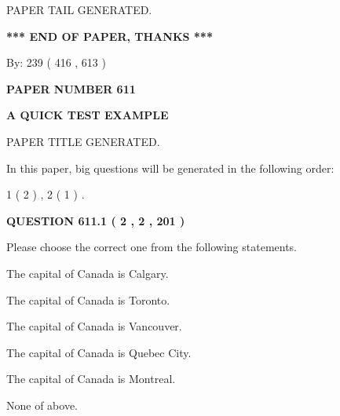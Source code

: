 \documentclass[12pt]{article}
\begin{document}
   
   
\vspace{2.0in} PAPER TAIL GENERATED.
   
   
   
   
\vspace{1.0in} 
{\textbf{\large{ *** END OF PAPER, THANKS *** }}} 
   
   
\hspace{1.0in} By: 
 239 ( 416 ,  613 )
   
   
   
   
\newpage 
\setcounter{page}{ 
   611001 } 
   
   
   
   
 {\textbf{ \Large{ PAPER NUMBER  611  }}}
   
   
\vspace{0.2in}
   
   
   
   
   
   
   
   
 \vspace{0.2in}
{\LARGE {\textbf{ A QUICK TEST EXAMPLE}}}
   
   
 PAPER TITLE GENERATED.
   
   
   
\vspace{0.2in}
   
In this paper, big questions will be generated in the following order: 
   
   
   1 ( 2 )
 ,
   2 ( 1 )
 .
  
\vspace{0.2in}
  
{\textbf{\Large{QUESTION
611.1 
 ( 2 , 2 , 201 )
}}}
  
  
Please choose the correct one from the following statements.
 
 
The capital of Canada is Calgary.
 
 
The capital of Canada is Toronto.
 
 
The capital of Canada is Vancouver.
 
 
The capital of Canada is Quebec City.
 
 
The capital of Canada is Montreal.
 
 
 None of above.
 
\end{document}
